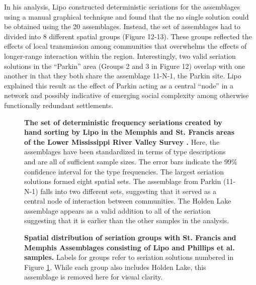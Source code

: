 \documentclass[10pt,letterpaper]{article}
\begin{document}
In his analysis, Lipo  \cite{Lipo2001a,Lipo2008} constructed deterministic seriations for the assemblages using a manual graphical technique and found that the no single solution could be obtained using the 20 assemblages. Instead, the set of assemblages had to divided into 8 different spatial groups (Figure 12-13). These groups reflected the effects of local transmission among communities that overwhelms the effects of longer-range interaction within the region. Interestingly, two valid seriation solutions in the “Parkin” area (Groups 2 and 3 in Figure 12) overlap with one another in that they both share the assemblage 11-N-1, the Parkin site. Lipo \cite{Lipo2001a} explained this result as the effect of Parkin acting as a central “node” in a network and possibly indicative of emerging social complexity among otherwise functionally redundant settlements. 

\begin{figure}[h]
\caption{{\bf The set of deterministic frequency seriations created by hand sorting by Lipo \cite{Lipo2001a}  in the Memphis and St. Francis areas of the Lower Mississippi River Valley Survey \cite{Phillips1951}.} Here, the assemblages have been standardized in terms of type descriptions and are all of sufficient sample sizes. The error bars indicate the 99\% confidence interval for the type frequencies. The largest seriation solutions formed eight spatial sets. The assemblage from Parkin (11-N-1) falls into two different sets, suggesting that it served as a central node of interaction between communities. The Holden Lake assemblage appears as a valid addition to all of the seriation suggesting that it is earlier than the other samples in the analysis.}
\label{fig12}
\end{figure}

\begin{figure}[h]
\caption{{\bf Spatial distribution of seriation groups with St. Francis and Memphis Assemblages consisting of Lipo \cite{Lipo2001a} and Phillips et al. \cite{Phillips1951} samples.} Labels for groups refer to seriation solutions numbered in Figure \ref{fig12}. While each group also includes Holden Lake, this assemblage is removed here for visual clarity.}
\label{fig13}
\end{figure}
\end{document}
